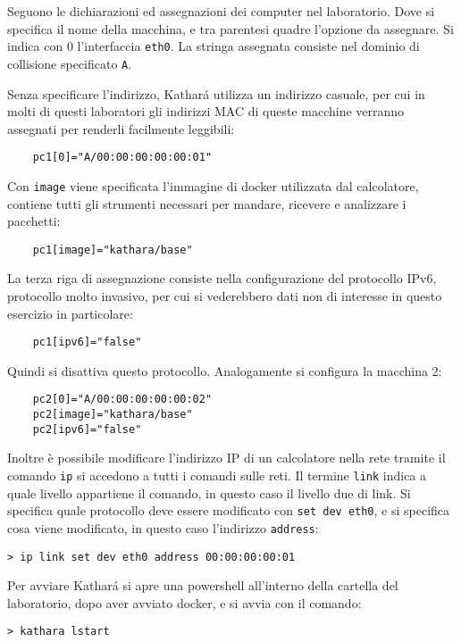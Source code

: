 \documentclass{article}
\numberwithin{equation}{subsection}
\begin{document}
Seguono le dichiarazioni ed assegnazioni dei computer nel laboratorio. Dove si 
specifica il nome della macchina, e tra parentesi quadre l'opzione da assegnare. 
Si indica con $0$ l'interfaccia \verb|eth0|. La stringa assegnata consiste nel 
dominio di collisione specificato \verb|A|. 

Senza specificare l'indirizzo, Kathar\'{a} utilizza un indirizzo casuale, per cui 
in molti di questi laboratori gli indirizzi MAC di queste macchine verranno 
assegnati per renderli facilmente leggibili:

\begin{verbatim}
	pc1[0]="A/00:00:00:00:00:01"
\end{verbatim}

Con \verb|image| viene specificata l'immagine di docker utilizzata dal calcolatore, 
contiene tutti gli strumenti necessari per mandare, ricevere e analizzare i pacchetti: 
\begin{verbatim}
	pc1[image]="kathara/base"
\end{verbatim}
La terza riga di assegnazione consiste nella configurazione del protocollo 
IPv6, protocollo molto invasivo, per cui si vederebbero dati non di interesse 
in questo esercizio in particolare:
\begin{verbatim}
	pc1[ipv6]="false"
\end{verbatim} 
Quindi si disattiva questo protocollo. Analogamente 
si configura la macchina 2:
\begin{verbatim}
	pc2[0]="A/00:00:00:00:00:02"
	pc2[image]="kathara/base"
	pc2[ipv6]="false"
\end{verbatim}
Inoltre è possibile modificare l'indirizzo IP di un calcolatore nella rete 
tramite il comando \verb|ip| si accedono a tutti i comandi sulle reti. 
Il termine \verb|link| indica a quale livello appartiene il comando, in questo caso il livello due di link. 
Si specifica quale protocollo deve essere modificato con \verb|set dev eth0|, e si specifica cosa viene modificato, in questo caso l'indirizzo \verb|address|:
\begin{verbatim}
> ip link set dev eth0 address 00:00:00:00:01
\end{verbatim}

Per avviare Kathar\'{a} si apre una powershell all'interno della cartella del laboratorio, dopo aver avviato docker, e si avvia con il comando:
\begin{verbatim}
> kathara lstart
\end{verbatim}
\end{document}
